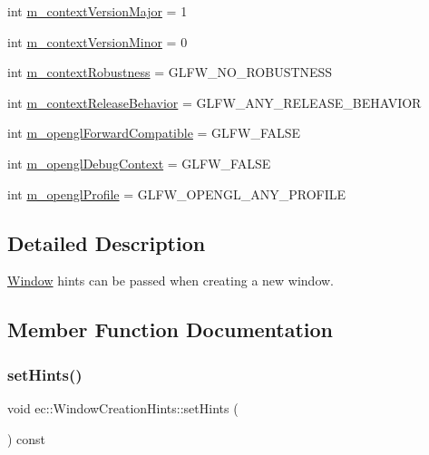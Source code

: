 \begin{DoxyCompactItemize}
int \mbox{\hyperlink{structec_1_1_window_creation_hints_a4a14a7429110d8ed1d1a958bd411977e}{m\+\_\+context\+Version\+Major}} = 1
\item 
int \mbox{\hyperlink{structec_1_1_window_creation_hints_a2be432af29a647f44bba87ee5d6225e4}{m\+\_\+context\+Version\+Minor}} = 0
\item 
int \mbox{\hyperlink{structec_1_1_window_creation_hints_ae07d3125cec0371769c080aba56a9a3b}{m\+\_\+context\+Robustness}} = G\+L\+F\+W\+\_\+\+N\+O\+\_\+\+R\+O\+B\+U\+S\+T\+N\+E\+SS
\item 
int \mbox{\hyperlink{structec_1_1_window_creation_hints_ac3b3b32240eea7148924b944bea146af}{m\+\_\+context\+Release\+Behavior}} = G\+L\+F\+W\+\_\+\+A\+N\+Y\+\_\+\+R\+E\+L\+E\+A\+S\+E\+\_\+\+B\+E\+H\+A\+V\+I\+OR
\item 
int \mbox{\hyperlink{structec_1_1_window_creation_hints_abfa30a3da29c0037255bb90e5b6a6866}{m\+\_\+opengl\+Forward\+Compatible}} = G\+L\+F\+W\+\_\+\+F\+A\+L\+SE
\item 
int \mbox{\hyperlink{structec_1_1_window_creation_hints_a87a7f6e29e26ba7126e7064e1e60e957}{m\+\_\+opengl\+Debug\+Context}} = G\+L\+F\+W\+\_\+\+F\+A\+L\+SE
\item 
int \mbox{\hyperlink{structec_1_1_window_creation_hints_a872785f08bf23d138d7cc61279ba928c}{m\+\_\+opengl\+Profile}} = G\+L\+F\+W\+\_\+\+O\+P\+E\+N\+G\+L\+\_\+\+A\+N\+Y\+\_\+\+P\+R\+O\+F\+I\+LE
\end{DoxyCompactItemize}


\subsection{Detailed Description}
\mbox{\hyperlink{classec_1_1_window}{Window}} hints can be passed when creating a new window. 

\subsection{Member Function Documentation}
\mbox{\label{structec_1_1_window_creation_hints_ae62c9820ab420fb7ada244293c6ffa27}} 
\subsubsection{\texorpdfstring{set\+Hints()}{setHints()}}
{\footnotesize\ttfamily void ec\+::\+Window\+Creation\+Hints\+::set\+Hints (\begin{DoxyParamCaption}{ }\end{DoxyParamCaption}) const}



